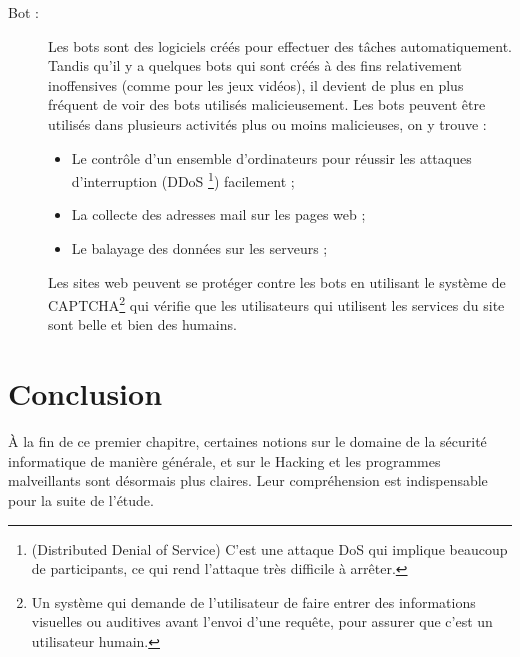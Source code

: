 \begin{description}
        \item[Bot :] Les bots sont des logiciels créés pour effectuer des tâches automatiquement. 
            Tandis qu’il y a quelques bots qui sont créés à des fins relativement inoffensives 
            (comme pour les jeux vidéos), il devient de plus en plus fréquent de voir des bots utilisés malicieusement. 
            Les bots peuvent être utilisés dans plusieurs activités plus ou moins malicieuses, on y trouve :
            \begin{itemize}
                \item Le contrôle d'un ensemble d’ordinateurs pour réussir les attaques d’interruption (DDoS
                    \footnote{(Distributed Denial of Service) C'est une attaque DoS qui implique beaucoup de
                    participants, ce qui rend l'attaque très difficile à arrêter.}) facilement ;
                \item La collecte des adresses mail sur les pages web ;
                \item Le balayage des données sur les serveurs ;
            \end{itemize}
            Les sites web peuvent se protéger contre les bots en utilisant le système de 
            CAPTCHA\footnote{Un système qui demande de l'utilisateur de faire entrer des informations visuelles ou
            auditives avant l'envoi d'une requête, pour assurer que c'est un utilisateur humain.} qui vérifie que 
            les utilisateurs qui utilisent les services du site sont belle et bien des humains. 
            \cite{malware_types} %
    \end{description}


\section{Conclusion}
À la fin de ce premier chapitre, certaines notions sur le domaine de la sécurité informatique de manière générale, et sur le Hacking et les programmes malveillants sont désormais plus claires. 
Leur compréhension est indispensable pour la suite de l'étude.
